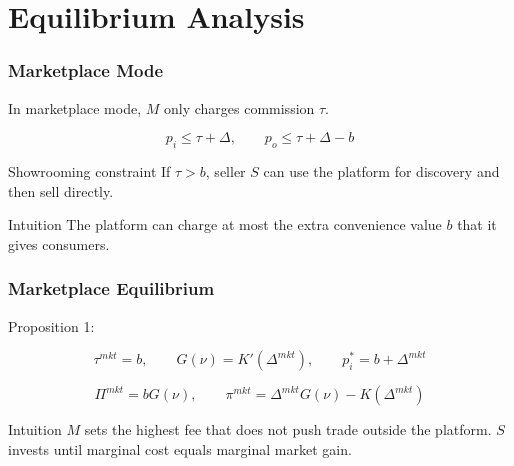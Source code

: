 \documentclass[aspectratio=169,AutoFakeBold,AutoFakeSlant]{beamer}
\begin{document}
\section{Equilibrium Analysis}

\begin{frame}
  \frametitle{Marketplace Mode}
  \small
  In marketplace mode, $M$ only charges commission $\tau$.

  \begin{equation*}
    p_i \leq \tau+\Delta, \qquad p_o \leq \tau+\Delta-b
  \end{equation*}

  \begin{block}{Showrooming constraint}
    If $\tau>b$, seller $S$ can use the platform for discovery and then sell directly.
  \end{block}

  \begin{alertblock}{Intuition}
    The platform can charge at most the extra convenience value $b$ that it gives consumers.
  \end{alertblock}
\end{frame}

\begin{frame}
  \frametitle{Marketplace Equilibrium}
  \small
  Proposition 1:

  \begin{equation*}
    \tau^{mkt}=b, \qquad
    G(\nu)=K'(\Delta^{mkt}), \qquad
    p_i^*=b+\Delta^{mkt}
  \end{equation*}

  \begin{equation*}
    \Pi^{mkt}=bG(\nu), \qquad
    \pi^{mkt}=\Delta^{mkt}G(\nu)-K(\Delta^{mkt})
  \end{equation*}

  \begin{block}{Intuition}
    $M$ sets the highest fee that does not push trade outside the platform. $S$ invests until marginal cost equals marginal market gain.
  \end{block}
\end{frame}
\end{document}

